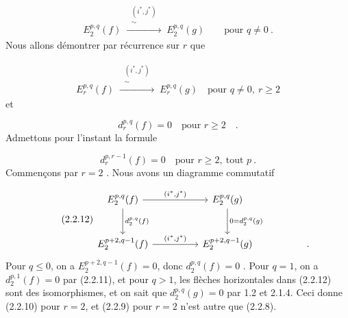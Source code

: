 \begin{multline}\tag{2.2.8}
E_2^{p,q}(f) \;\xrightarrow{\;\substack{(i^*,j^*)\\ \sim}\;}\; E_2^{p,q}(g) \qquad \text{pour } q \neq 0 \ .
\end{multline}
Nous allons démontrer par récurrence sur $r$ que

\begin{multline}\tag{2.2.9}
E_r^{p,q}(f) \;\xrightarrow{\;\substack{(i^*,j^*)\\ \sim}\;}\; E_r^{p,q}(g) \quad \text{pour } q \neq 0, \ r \geq 2
\end{multline}
et

\begin{equation}\tag{2.2.10}
d_r^{p,q}(f) = 0 \quad \text{pour } r \geq 2 \quad .
\end{equation}
Admettons pour l'instant la formule

\begin{equation}\tag{2.2.11}
d_r^{p,r-1}(f) = 0 \quad \text{pour } r \geq 2, \ \text{tout } p \ .
\end{equation}
Commençons par $r = 2$ . Nous avons un diagramme commutatif

\begin{equation}\tag{2.2.12}
\begin{tikzcd}[column sep=huge, row sep=large]
E_2^{p,q}(f) \arrow[r, "{(i^*,j^*)}"] \arrow[d, "{d_2^{p,q}(f)}"] & E_2^{p,q}(g) \arrow[d, "{0 = d_2^{p,q}(g)}"] \\
E_2^{p+2,q-1}(f) \arrow[r, "{(i^*,j^*)}"] & E_2^{p+2,q-1}(g) & .
\end{tikzcd}
\end{equation}
Pour $q \leq 0$, on a $E_2^{p+2,q-1}(f) = 0$, donc $d_2^{p,q}(f) = 0$ . Pour $q = 1$, on a $d_2^{p,1}(f) = 0$ par (2.2.11), et pour $q > 1$, les flèches horizontales dans (2.2.12) sont des isomorphismes, et on sait que $d_2^{p,q}(g) = 0$ par 1.2 et 2.1.4. Ceci donne (2.2.10) pour $r = 2$, et (2.2.9) pour $r = 2$ n'est autre que (2.2.8).


